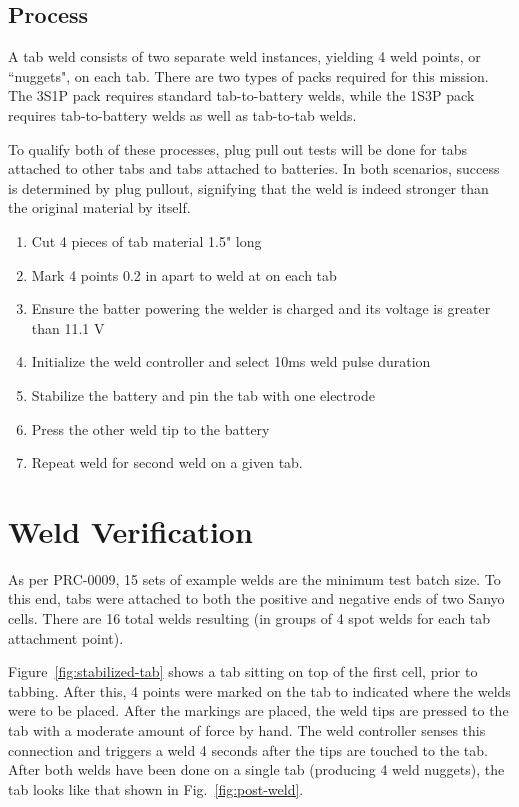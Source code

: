 \documentclass{article}
\begin{document}
\subsection{Process}


A tab weld consists of two separate weld instances, yielding 4 weld points, or ``nuggets", on each tab. There are two types of packs required for this mission. The 3S1P pack requires standard tab-to-battery welds, while the 1S3P pack requires tab-to-battery welds as well as tab-to-tab welds.

To qualify both of these processes, plug pull out tests will be done for tabs attached to other tabs and tabs attached to batteries. In both scenarios, success is determined by plug pullout, signifying that the weld is indeed stronger than the original material by itself.



\begin{enumerate}
\item Cut 4 pieces of tab material 1.5" long
\item Mark 4 points 0.2 in apart to weld at on each tab
\item Ensure the batter powering the welder is charged and its voltage is greater than 11.1 V
\item Initialize the weld controller and select 10ms weld pulse duration
\item Stabilize the battery and pin the tab with one electrode
\item Press the other weld tip to the battery
\item Repeat weld for second weld on a given tab. 
\end{enumerate}


\section{Weld Verification}

As per PRC-0009, 15 sets of example welds are the minimum test batch size. To this end, tabs were attached to both the positive and negative ends of two Sanyo cells. There are 16 total welds resulting (in groups of 4 spot welds for each tab attachment point).

Figure~\ref{fig:stabilized-tab} shows a tab sitting on top of the first cell, prior to tabbing. After this, 4 points were marked on the tab to indicated where the welds were to be placed. After the markings are placed, the weld tips are pressed to the tab with a moderate amount of force by hand. The weld controller senses this connection and triggers a weld 4 seconds after the tips are touched to the tab. After both welds have been done on a single tab (producing 4 weld nuggets), the tab looks like that shown in Fig.~\ref{fig:post-weld}.
\end{document}
